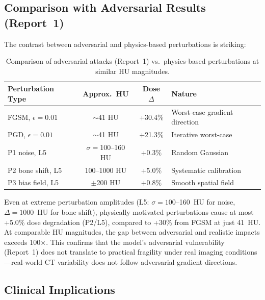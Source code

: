 \documentclass[11pt,a4paper]{article}
\begin{document}
\subsection{Comparison with Adversarial Results (Report~1)}

The contrast between adversarial and physics-based perturbations is striking:

\begin{table}[H]
\centering
\caption{Comparison of adversarial attacks (Report~1) vs.\ physics-based perturbations at similar HU magnitudes.}
\label{tab:comparison}
\begin{tabular}{@{}lccl@{}}
\toprule
\textbf{Perturbation Type} & \textbf{Approx.\ HU} & \textbf{Dose $\Delta$} & \textbf{Nature} \\
\midrule
FGSM, $\epsilon=0.01$ & $\sim$41 HU & +30.4\% & Worst-case gradient direction \\
PGD, $\epsilon=0.01$ & $\sim$41 HU & +21.3\% & Iterative worst-case \\
P1 noise, L5 & $\sigma=$100--160 HU & +0.3\% & Random Gaussian \\
P2 bone shift, L5 & 100--1000 HU & +5.0\% & Systematic calibration \\
P3 bias field, L5 & $\pm$200 HU & +0.8\% & Smooth spatial field \\
\bottomrule
\end{tabular}
\end{table}

Even at extreme perturbation amplitudes (L5: $\sigma = 100$--160~HU for noise, $\Delta = 1000$~HU for bone shift), physically motivated perturbations cause at most +5.0\% dose degradation (P2/L5), compared to +30\% from FGSM at just 41~HU. At comparable HU magnitudes, the gap between adversarial and realistic impacts exceeds 100$\times$. This confirms that the model's adversarial vulnerability (Report~1) does not translate to practical fragility under real imaging conditions---real-world CT variability does not follow adversarial gradient directions.

\subsection{Clinical Implications}
\end{document}
